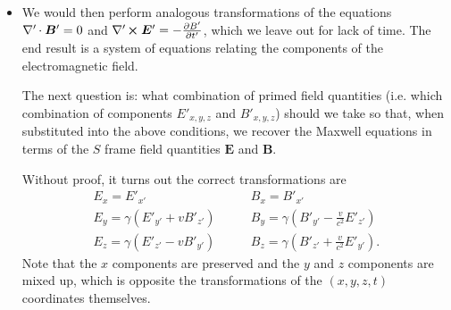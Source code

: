 \documentclass[11pt, a4paper]{article}
\renewcommand{\vec}[1]{\bm{#1}} %
\newcommand{\E}{\vec{E}} %
\newcommand{\B}{\vec{B}} %
\newcommand{\divp}{\nabla' \mspace{-1mu} \cdot}  %
\newcommand{\curlp}{\nabla' \mspace{-2mu} \cross}
\begin{document}
\begin{itemize}
    \item We would then perform analogous transformations of the equations $ \divp \B' = 0 $ and $ \curlp \E' = - \pdv{B'}{t'} $, which we leave out for lack of time. The end result is a system of equations relating the components of the electromagnetic field.
    
    The next question is: what combination of primed field quantities (i.e. which combination of components $ E'_{x,y,z} $ and $ B'_{x,y,z} $) should we take so that, when substituted into the above conditions, we recover the Maxwell equations in terms of the $ S $ frame field quantities $ \E $ and $ \B $.
	
	Without proof, it turns out the correct transformations are 
    \begin{equation*}
        \begin{array}{ll}
            E_{x} = E'_{x'} & \qquad B_{x} = B'_{x'}\\
            E_{y} = \gamma (E'_{y'} + v B'_{z'}) & \qquad B_{y} = \gamma \left (B'_{y'} - \frac{v}{c^{2}} E'_{z'}\right)\\
            E_{z} = \gamma (E'_{z'} - vB'_{y'}) & \qquad B_{z} = \gamma \left (B'_{z'} + \frac{v}{c^{2}} E'_{y'}\right ).
        \end{array}
    \end{equation*}
   	Note that the $ x $	components are preserved and the $ y $ and $ z $ components are mixed up, which is opposite the transformations of the $ (x, y, z, t) $ coordinates themselves.
\end{itemize}
\end{document}
